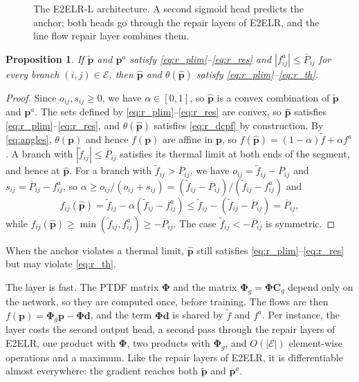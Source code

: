 \documentclass[12pt]{article}
\newtheorem{proposition}{Proposition}
\begin{document}
\begin{figure}[htbp]
    \centering
    
    \caption{The E2ELR-L architecture. A second sigmoid head predicts the anchor; both heads go through the repair layers of E2ELR, and the line flow repair layer combines them.}
    \label{fig:architecture}
\end{figure}

\begin{proposition} \label{prop:line_repair}
    If $\tilde{\boldsymbol{p}}$ and $\boldsymbol{p}^a$ satisfy \eqref{eq:r_plim}--\eqref{eq:r_res} and $|f^a_{ij}| \leq \overline{P}_{ij}$ for every branch $(i,j) \in \mathcal{E}$, then $\hat{\boldsymbol{p}}$ and $\theta(\hat{\boldsymbol{p}})$ satisfy \eqref{eq:r_plim}--\eqref{eq:r_th}.
\end{proposition}
\begin{proof}
    Since $o_{ij}, s_{ij} \geq 0$, we have $\alpha \in [0, 1]$, so $\hat{\boldsymbol{p}}$ is a convex combination of $\tilde{\boldsymbol{p}}$ and $\boldsymbol{p}^a$.
    The sets defined by \eqref{eq:r_plim}--\eqref{eq:r_res} are convex, so $\hat{\boldsymbol{p}}$ satisfies \eqref{eq:r_plim}--\eqref{eq:r_res}, and $\theta(\hat{\boldsymbol{p}})$ satisfies \eqref{eq:r_dcpf} by construction.
    By \eqref{eq:angles}, $\theta(\boldsymbol{p})$ and hence $f(\boldsymbol{p})$ are affine in $\boldsymbol{p}$, so $f(\hat{\boldsymbol{p}}) = (1 - \alpha) \tilde{f} + \alpha f^a$. A branch with $|\tilde{f}_{ij}| \leq \overline{P}_{ij}$ satisfies its thermal limit at both ends of the segment, and hence at $\hat{\boldsymbol{p}}$. For a branch with $\tilde{f}_{ij} > \overline{P}_{ij}$, we have $o_{ij} = \tilde{f}_{ij} - \overline{P}_{ij}$ and $s_{ij} = \overline{P}_{ij} - f^a_{ij}$, so $\alpha \geq o_{ij} / (o_{ij} + s_{ij}) = (\tilde{f}_{ij} - \overline{P}_{ij}) / (\tilde{f}_{ij} - f^a_{ij})$ and
    \[
        f_{ij}(\hat{\boldsymbol{p}}) = \tilde{f}_{ij} - \alpha (\tilde{f}_{ij} - f^a_{ij}) \leq \tilde{f}_{ij} - (\tilde{f}_{ij} - \overline{P}_{ij}) = \overline{P}_{ij},
    \]
    while $f_{ij}(\hat{\boldsymbol{p}}) \geq \min(\tilde{f}_{ij}, f^a_{ij}) \geq -\overline{P}_{ij}$. The case $\tilde{f}_{ij} < -\overline{P}_{ij}$ is symmetric.
\end{proof}

When the anchor violates a thermal limit, $\hat{\boldsymbol{p}}$ still satisfies \eqref{eq:r_plim}--\eqref{eq:r_res} but may violate \eqref{eq:r_th}.

The layer is fast. The PTDF matrix $\boldsymbol{\Phi}$ and the matrix $\boldsymbol{\Phi}_g = \boldsymbol{\Phi} \boldsymbol{C}_g$ depend only on the network, so they are computed once, before training. The flows are then $f(\boldsymbol{p}) = \boldsymbol{\Phi}_g \boldsymbol{p} - \boldsymbol{\Phi} \boldsymbol{d}$, and the term $\boldsymbol{\Phi} \boldsymbol{d}$ is shared by $\tilde{f}$ and $f^a$. Per instance, the layer costs the second output head, a second pass through the repair layers of E2ELR, one product with $\boldsymbol{\Phi}$, two products with $\boldsymbol{\Phi}_g$, and $O(|\mathcal{E}|)$ element-wise operations and a maximum. Like the repair layers of E2ELR, it is differentiable almost everywhere: the gradient reaches both $\tilde{\boldsymbol{p}}$ and $\boldsymbol{p}^a$.
\end{document}
